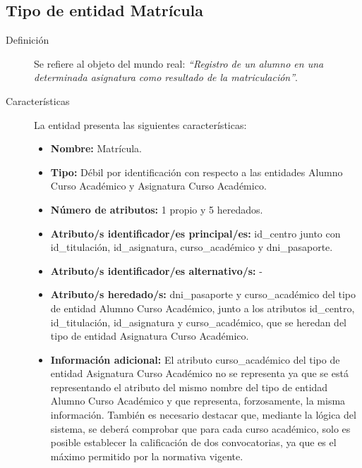 \subsection{Tipo de entidad Matrícula}

   \begin{description}

   \item[Definición] Se refiere al objeto del mundo real: \emph{``Registro de un
   alumno en una determinada asignatura como resultado de la matriculación''}.

   \item[Características] La entidad presenta las siguientes características:
      \begin{itemize}
         \item \textbf{Nombre:} Matrícula.
         \item \textbf{Tipo:} Débil por identificación con respecto a las
         entidades Alumno Curso Académico y Asignatura Curso Académico.
         \item \textbf{Número de atributos:} 1 propio y 5 heredados.
         \item \textbf{Atributo/s identificador/es principal/es:}
         id\_centro junto con \newline id\_titulación, id\_asignatura,
         curso\_académico y dni\_pasaporte.
         \item \textbf{Atributo/s identificador/es alternativo/s:} -
         \item \textbf{Atributo/s heredado/s:} dni\_pasaporte y curso\_académico
         del tipo de entidad Alumno Curso Académico, junto a los atributos id\_centro,
         id\_titulación, id\_asignatura y curso\_académico, que se heredan del
         tipo de entidad Asignatura Curso Académico.
         \item \textbf{Información adicional:} El atributo curso\_académico del
         tipo de entidad Asignatura Curso Académico no se representa ya que se
         está representando el atributo del mismo nombre del tipo de entidad
         Alumno Curso Académico y que representa, forzosamente, la misma
         información. También es necesario destacar que, mediante la lógica del
         sistema, se deberá comprobar que para cada curso académico, solo es
         posible establecer la calificación de dos convocatorias, ya que es el
         máximo permitido por la normativa vigente.
      \end{itemize}


\end{description}
